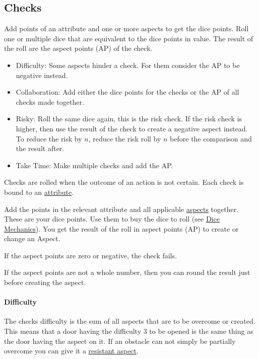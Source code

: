 \documentclass[11pt]{article}
\begin{document}
{\subsection{Checks}
\label{sec:orgfdfbc9b}
\begin{short}
Add points of an attribute and one or more aspects to get the dice points. Roll one or multiple dice that are equivalent to the dice points in value. The result of the roll are the aspect points (AP) of the check.
\begin{itemize}
\item Difficulty: Some aspects hinder a check. For them consider the AP to be negative instead.
\item Collaboration: Add either the dice points for the checks or the AP of all checks made together.
\item Risky: Roll the same dice again, this is the risk check. If the risk check is higher, then use the result of the check to create a negative aspect instead. To reduce the risk by \(n\), reduce the risk roll by \(n\) before the comparison and the result after.
\item Take Time: Make multiple checks and add the AP.
\end{itemize}
\end{short}

Checks are rolled when the outcome of an action is not certain. Each check is bound to an \hyperref[sec:orgfaebabe]{attribute}.

Add the points in the relevant attribute and all applicable \hyperref[sec:orga25965a]{aspects} together. These are your dice points. Use them to buy the dice to roll (see \hyperref[sec:org34db9e3]{Dice Mechanics}). You get the result of the roll in aspect points (AP) to create or change an Aspect.

If the aspect points are zero or negative, the check fails.

If the aspect points are not a whole number, then you can round the result just before creating the aspect.
\paragraph*{Difficulty}
\label{sec:org127f55b}
The checks difficulty is the sum of all aspects that are to be overcome or created. This means that a door having the difficulty 3 to be opened is the same thing as the door having the aspect  on it. If an obstacle can not simply be partially overcome you can give it a \hyperref[sec:orgeb44c0a]{resistant aspect}.

}
\end{document}
